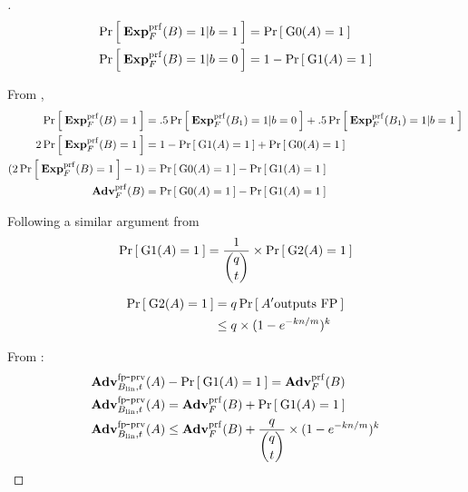 \begin{proof}[]
\begin{align}
\Prob{\ExpPRF{F}{B} = 1|b=1} &= \Prob{\game{0}(A)=1}\label{eq:m1T2}\\
\Prob{\ExpPRF{F}{B} = 1|b=0} &= 1-\Prob{\game{1}(A)=1}\label{eq:m2T2}
\end{align}

\noindent
From ,
\begin{align}
\nonumber \Prob{\ExpPRF{F}{B} = 1} &= .5\Prob{\ExpPRF{F}{B_1}=1|b=0} + .5\Prob{\ExpPRF{F}{B_1} = 1|b=1}\\
\nonumber 2\Prob{\ExpPRF{F}{B} = 1} &= 1-\Prob{\game{1}(A)=1} + \Prob{\game{0}(A)=1}\\
\nonumber (2\Prob{\ExpPRF{F}{B} = 1} - 1)  &= \Prob{\game{0}(A)=1} - \Prob{\game{1}(A)=1}\\
 \AdvPRF{F}{B} &= \Prob{\game{0}(A)=1} - \Prob{\game{1}(A)=1} \label{eq:1T2}
\end{align}

\noindent
Following a similar argument from 
\begin{equation}
\Prob{\game{1}(A)=1} = \frac{1}{\dbinom{q}{t}}\times\Prob{\game{2}(A)=1}\label{eq:3T2}
\end{equation}

\begin{align}
\nonumber \Prob{\game{2}(A)=1} &= q\Prob{A' \mbox{outputs FP}}\\
& \leq q \times (1-e^{-kn/m})^k \label{eq:4T2}
\end{align}


\noindent
From : \\
\begin{align}
\nonumber \AdvFPSecHash{B_\mathrm{lin},t}{A} &- \Prob{\game{1}(A)=1} =  \AdvPRF{F}{B}   \\
\nonumber \AdvFPSecHash{B_\mathrm{lin},t}{A}  &=  \AdvPRF{F}{B} + \Prob{\game{1}(A)=1}  \\
\AdvFPSecHash{B_\mathrm{lin},t}{A} &\leq  \AdvPRF{F}{B}  + \frac{q}{\dbinom{q}{t}} \times  (1-e^{-kn/m})^k
\end{align}


\end{proof}
